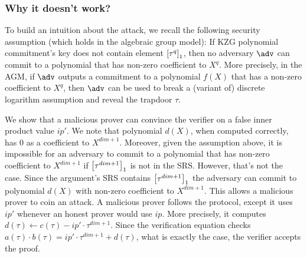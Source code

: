 \documentclass[runningheads,11pt,a4paper]{llncs}
\begin{document}
\subsubsection*{Why it doesn't work?}
To build an intuition about the attack, we recall the following security assumption (which holds in the algebraic group model): If KZG polynomial commitment's key does not contain element $\left[\tau^q\right]_{1}$, then no adversary $\adv$ can commit to a polynomial that has non-zero coefficient to $X^q$. More precisely, in the AGM, if $\adv$ outputs a commitment to a polynomial $f(X)$ that has a non-zero coefficient to $X^q$, then $\adv$ can be used to break a (variant of) discrete logarithm assumption and reveal the trapdoor $\tau$. 

We show that a malicious prover can convince the verifier on a false inner product value $ip'$. We note that polynomial $d(X)$, when computed correctly, has $0$ as a coefficient to $X^{dim + 1}$. Moreover, given the assumption above, it is impossible for an adversary to commit to a polynomial that has non-zero coefficient to $X^{dim + 1}$ if $\left[\tau^{dim + 1}\right]_{1}$ is not in the SRS. However, that's not the case. Since the argument's SRS contains $\left[\tau^{dim + 1}\right]_{1}$ the adversary can commit to polynomial $d(X)$ with non-zero coefficient to $X^{dim + 1}$. This allows a malicious prover to coin an attack. A malicious prover follows the protocol, except it uses $ip'$ whenever an honest prover would use $ip$. More precisely, it computes $d(\tau) \gets c(\tau) - ip' \cdot \tau^{dim + 1}$. Since the verification equation checks $a(\tau) \cdot b (\tau) = ip' \cdot \tau^{dim + 1} + d(\tau)$, what is exactly the case, the verifier accepts the proof.
\end{document}

